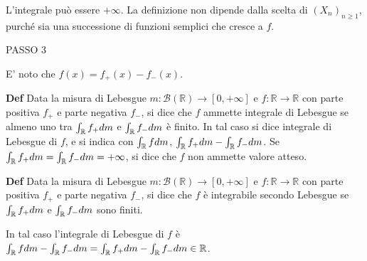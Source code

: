 \documentclass{article}
\begin{document}
L'integrale pu\`{o} essere $+\infty $. La definizione non dipende dalla
scelta di $\left( X_{n}\right) _{n\geq 1}$, purch\'{e} sia una successione
di funzioni semplici che cresce a $f$.

PASSO 3

E' noto che $f\left( x\right) =f_{+}\left( x\right) -f_{-}\left( x\right) $.

\textbf{Def }Data la misura di Lebesgue $m:\mathcal{B}\left( 
\mathbb{R}
\right) \rightarrow \left[ 0,+\infty \right] $ e $f:%
\mathbb{R}
\rightarrow 
\mathbb{R}
$ con parte positiva $f_{+}$ e parte negativa $f_{-}$, si dice che $f$
ammette integrale di Lebesgue se almeno uno tra $\int_{%
\mathbb{R}
}f_{+}dm$ e $\int_{%
\mathbb{R}
}f_{-}dm$ \`{e} finito. In tal caso si dice integrale di Lebesgue di $f$, e
si indica con $\int_{%
\mathbb{R}
}fdm$, $\int_{%
\mathbb{R}
}f_{+}dm-\int_{%
\mathbb{R}
}f_{-}dm$. Se $\int_{%
\mathbb{R}
}f_{+}dm=\int_{%
\mathbb{R}
}f_{-}dm=+\infty $, si dice che $f$ non ammette valore atteso.

\textbf{Def }Data la misura di Lebesgue $m:\mathcal{B}\left( 
\mathbb{R}
\right) \rightarrow \left[ 0,+\infty \right] $ e $f:%
\mathbb{R}
\rightarrow 
\mathbb{R}
$ con parte positiva $f_{+}$ e parte negativa $f_{-}$, si dice che $f$ \`{e}
integrabile secondo Lebesgue se $\int_{%
\mathbb{R}
}f_{+}dm$ e $\int_{%
\mathbb{R}
}f_{-}dm$ sono finiti.

In tal caso l'integrale di Lebesgue di $f$ \`{e} $\int_{%
\mathbb{R}
}fdm-\int_{%
\mathbb{R}
}f_{-}dm=\int_{%
\mathbb{R}
}f_{+}dm-\int_{%
\mathbb{R}
}f_{-}dm\in 
\mathbb{R}
$.
\end{document}
